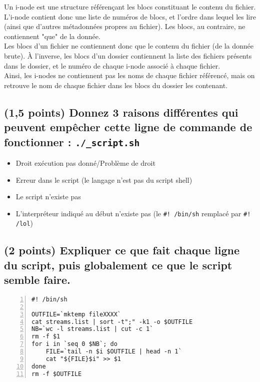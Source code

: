 \documentclass[11pt,a4paper]{article}
\newcommand{\TTBF}[1]{\texttt{\textbf{#1}}}
\begin{document}
\bigskip
Un i-node est une structure référençant les blocs constituant le contenu du fichier.
L'i-node contient donc une liste de numéros de blocs, et l'ordre dans lequel les lire (ainsi que d'autres métadonnées propres au fichier).
Les blocs, au contraire, ne contiennent "que" de la donnée.\\
Les blocs d'un fichier ne contiennent donc que le contenu du fichier (de la donnée brute).
\`A l'inverse, les blocs d'un dossier contiennent la liste des fichiers présents dans le dossier, et le numéro de chaque i-node associé à chaque fichier.\\
Ainsi, les i-nodes ne contiennent pas les noms de chaque fichier référencé, mais on retrouve le nom de chaque fichier dans les blocs du dossier les contenant.
\bigskip

\subsection{(1,5 points) Donnez 3 raisons différentes qui peuvent empêcher cette ligne de commande de fonctionner : \TTBF{./\_script.sh}}

\bigskip
\begin{itemize}
\item Droit exécution pas donné/Problème de droit
\item Erreur dans le script (le langage n'est pas du script shell)
\item Le script n'existe pas
\item L'interpréteur indiqué au début n'existe pas (le \texttt{\#! /bin/sh} remplacé par \texttt{\#! /lol})
\end{itemize}
\bigskip

\subsection{(2 points) Expliquer ce que fait chaque ligne du script, puis globalement ce que le script semble faire.}

\bigskip

\lstset{language=sh}
\begin{lstlisting}[frame=single,numbers=left,title={script.sh}]
#! /bin/sh

OUTFILE=`mktemp fileXXXX`
cat streams.list | sort -t";" -k1 -o $OUTFILE
NB=`wc -l streams.list | cut -c 1`
rm -f $1
for i in `seq 0 $NB`; do
	FILE=`tail -n $i $OUTFILE | head -n 1`
	cat "${FILE}$i" >> $1
done
rm -f $OUTFILE
\end{lstlisting}
\end{document}
